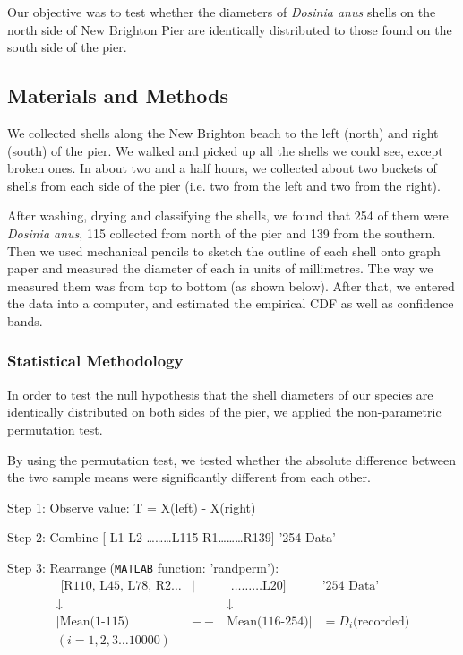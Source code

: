 
Our objective was to test whether the diameters of \textit{Dosinia anus} shells on the north side of New Brighton Pier are identically distributed to those found on the south side of the pier.

\subsection{Materials and Methods}

We collected shells along the New Brighton beach to the left (north) and right (south) of the pier. We walked and picked up all the shells we could see, except broken ones. In about two and a half hours, we collected about two buckets of shells from each side of the pier (i.e. two from the left and two from the right). 

After washing, drying and classifying the shells, we found that 254 of them were \textit{Dosinia anus}, 115 collected from north of the pier and 139 from the southern. Then we used mechanical pencils to sketch the outline of each shell onto graph paper and measured the diameter of each in units of millimetres. The way we measured them was from top to bottom (as shown below). After that, we entered the data into a computer, and estimated the empirical CDF as well as confidence bands. 


\subsubsection*{Statistical Methodology }

In order to test the null hypothesis that the shell diameters of our species are identically distributed on both sides of the pier, we applied the non-parametric permutation test. 

By using the permutation test, we tested whether the absolute difference between the two sample means were significantly different from each other.


Step 1: Observe value: T = X(left) - X(right)
                                
Step 2: Combine [ L1 L2 \ldots \ldots \ldots L115 R1\ldots \ldots \ldots R139] '254 Data'

Step 3: Rearrange ({\tt MATLAB} function: 'randperm'):
\begin{displaymath}
\begin{array}{cccc}
           \textrm{ [R110, L45, L78, R2\ldots}& |&\textrm{ \ldots \ldots \ldots L20] } & \textrm{'254 Data'}\\
									\downarrow &&\downarrow\\
                      |\textrm{Mean(1-115)}& --& \textrm{Mean(116-254)}| &= D_i \textrm{(recorded)}\\
		(i = 1, 2, 3 \ldots 10000) &&&
\end{array}
\end{displaymath}


